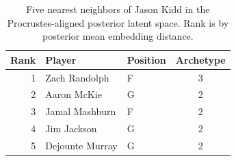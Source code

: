 \begin{table}[htbp]
  \centering\small
  \begin{tabular}{rllc}
    \toprule
    Rank & Player & Position & Archetype \\
    \midrule
    1 & Zach Randolph & F & 3 \\
    2 & Aaron McKie & G & 2 \\
    3 & Jamal Mashburn & F & 2 \\
    4 & Jim Jackson & G & 2 \\
    5 & Dejounte Murray & G & 2 \\
    \bottomrule
  \end{tabular}
  \caption{Five nearest neighbors of Jason Kidd in the Procrustes-aligned posterior latent space. Rank is by posterior mean embedding distance.}
  \label{tab:Jason_Kidd_neighbors}
\end{table}

